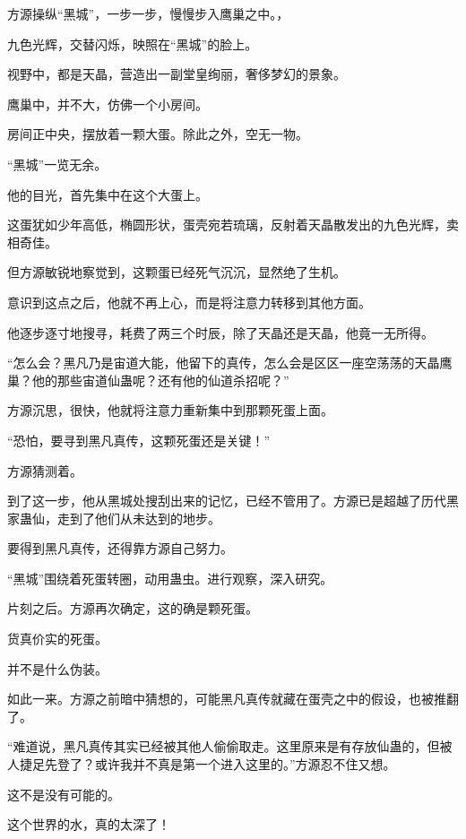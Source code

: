 
\begin{this_body}



方源操纵“黑城”，一步一步，慢慢步入鹰巢之中。，

九色光辉，交替闪烁，映照在“黑城”的脸上。

视野中，都是天晶，营造出一副堂皇绚丽，奢侈梦幻的景象。

鹰巢中，并不大，仿佛一个小房间。

房间正中央，摆放着一颗大蛋。除此之外，空无一物。

“黑城”一览无余。

他的目光，首先集中在这个大蛋上。

这蛋犹如少年高低，椭圆形状，蛋壳宛若琉璃，反射着天晶散发出的九色光辉，卖相奇佳。

但方源敏锐地察觉到，这颗蛋已经死气沉沉，显然绝了生机。

意识到这点之后，他就不再上心，而是将注意力转移到其他方面。

他逐步逐寸地搜寻，耗费了两三个时辰，除了天晶还是天晶，他竟一无所得。

“怎么会？黑凡乃是宙道大能，他留下的真传，怎么会是区区一座空荡荡的天晶鹰巢？他的那些宙道仙蛊呢？还有他的仙道杀招呢？”

方源沉思，很快，他就将注意力重新集中到那颗死蛋上面。

“恐怕，要寻到黑凡真传，这颗死蛋还是关键！”

方源猜测着。

到了这一步，他从黑城处搜刮出来的记忆，已经不管用了。方源已是超越了历代黑家蛊仙，走到了他们从未达到的地步。

要得到黑凡真传，还得靠方源自己努力。

“黑城”围绕着死蛋转圈，动用蛊虫。进行观察，深入研究。

片刻之后。方源再次确定，这的确是颗死蛋。

货真价实的死蛋。

并不是什么伪装。

如此一来。方源之前暗中猜想的，可能黑凡真传就藏在蛋壳之中的假设，也被推翻了。

“难道说，黑凡真传其实已经被其他人偷偷取走。这里原来是有存放仙蛊的，但被人捷足先登了？或许我并不真是第一个进入这里的。”方源忍不住又想。

这不是没有可能的。

这个世界的水，真的太深了！


\end{this_body}
